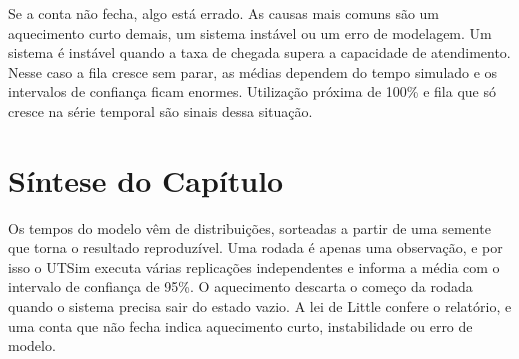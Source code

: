 Se a conta não fecha, algo está errado. As causas mais comuns são um aquecimento curto demais, um sistema instável ou um erro de modelagem. Um sistema é instável quando a taxa de chegada supera a capacidade de atendimento. Nesse caso a fila cresce sem parar, as médias dependem do tempo simulado e os intervalos de confiança ficam enormes. Utilização próxima de 100\% e fila que só cresce na série temporal são sinais dessa situação.

\section{Síntese do Capítulo}

\begin{sintese}
Os tempos do modelo vêm de distribuições, sorteadas a partir de uma semente que torna o resultado reproduzível. Uma rodada é apenas uma observação, e por isso o UTSim executa várias replicações independentes e informa a média com o intervalo de confiança de 95\%. O aquecimento descarta o começo da rodada quando o sistema precisa sair do estado vazio. A lei de Little confere o relatório, e uma conta que não fecha indica aquecimento curto, instabilidade ou erro de modelo.
\end{sintese}
